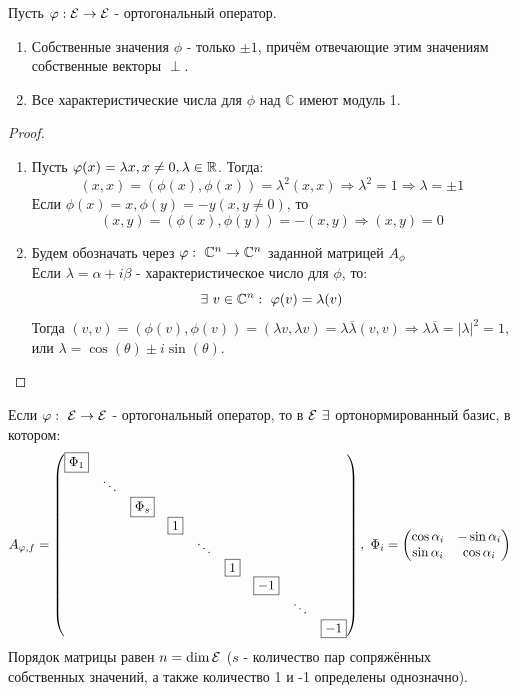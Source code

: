 \begin{theorem}
    Пусть $\varphi: \mathcal{E} \rightarrow \mathcal{E}$ - ортогональный оператор.
    \begin{enumerate}
        \item Собственные значения $\phi$ - только $\pm 1$, причём отвечающие этим значениям собственные векторы $\perp$.
        \item Все характеристические числа для $\phi$ над $\mathbb{C}$ имеют модуль 1. 
    \end{enumerate}
\end{theorem}
\begin{proof}\tab
    \begin{enumerate}
        \item Пусть $\varphi(x) = \lambda x, x \neq 0, \lambda \in \mathbb{R}$. Тогда:
        $$(x, x) = (\phi(x), \phi(x)) = \lambda^2(x,x) \Longrightarrow \lambda^2 = 1 \Longrightarrow \lambda = \pm 1$$ 
        Если $\phi(x) = x, \phi(y) = -y (x,y \neq 0)$, то
        $$(x, y) = (\phi(x), \phi(y)) = -(x, y) \Longrightarrow (x, y) = 0$$
        \item Будем обозначать через $\varphi: \ \mathbb{C}^n \to \mathbb{C}^n$ заданной матрицей $A_\phi$ \\
        Если $\lambda = \alpha + i\beta$ - характеристическое число для $\phi$, то: 
        $$\exists \ v \in \mathbb{C}^n: \ \varphi(v) = \lambda(v)$$
        Тогда $(v, v) = (\phi(v), \phi(v)) = (\lambda v, \lambda v) = \lambda \overline{\lambda}(v,v) \Longrightarrow \lambda \overline{\lambda} = |\lambda|^2 = 1$, или $\lambda = \cos(\theta) \pm i \sin(\theta)$.
    \end{enumerate}
\end{proof}
\begin{theorem}
    Если $\varphi: \ \mathcal{E} \to \mathcal{E}$ - ортогональный оператор, то в $\E \ \exists$ ортонормированный базис, в котором:
    $$A_{\phi,f} = \begin{pmatrix}
        \text{\fbox{$\Phi_1$}}\\
        \null & \ddots\\
        \null & \null & \text{\fbox{$\Phi_s$}}\\
        \null & \null & \null & \text{\fbox{$1$}} \\
        \null & \null & \null & \null & \ddots \\
        \null & \null & \null & \null & \null & \text{\fbox{$1$}}\\
        \null & \null & \null & \null & \null & \null & \text{\fbox{$-1$}} \\
        \null & \null & \null & \null & \null & \null & \null & \ddots \\
        \null & \null & \null & \null & \null & \null & \null & \null & \text{\fbox{$-1$}}
    \end{pmatrix}, \ \Phi_i = \begin{pmatrix}
        \cos \alpha_i & -\sin \alpha_i \\ \sin \alpha_i & \cos \alpha_i
    \end{pmatrix}$$   
    Порядок матрицы равен $ n = \dim \mathcal{E}$ ($s$ - количество пар сопряжённых собственных значений, а также количество 1 и -1 определены однозначно). 
\end{theorem} 

